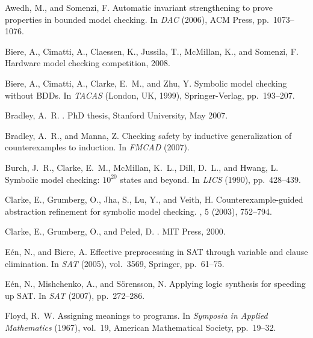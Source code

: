 \documentclass{llncs}
\begin{document}

\begin{thebibliography}{10}

{\sc Awedh, M., and Somenzi, F.}
\newblock Automatic invariant strengthening to prove properties in bounded
  model checking.
\newblock In {\em DAC\/} (2006), ACM Press, pp.~1073--1076.

{\sc Biere, A., Cimatti, A., Claessen, K., Jussila, T., McMillan, K., and
  Somenzi, F.}
\newblock Hardware model checking competition, 2008.

{\sc Biere, A., Cimatti, A., Clarke, E.~M., and Zhu, Y.}
\newblock Symbolic model checking without {BDD}s.
\newblock In {\em TACAS\/} (London, UK, 1999), Springer-Verlag, pp.~193--207.

{\sc Bradley, A.~R.}
.
\newblock PhD thesis, Stanford University, May 2007.

{\sc Bradley, A.~R., and Manna, Z.}
\newblock Checking safety by inductive generalization of counterexamples to
  induction.
\newblock In {\em FMCAD\/} (2007).

{\sc Burch, J.~R., Clarke, E.~M., McMillan, K.~L., Dill, D.~L., and Hwang, L.}
\newblock Symbolic model checking: $10^{20}$ states and beyond.
\newblock In {\em LICS\/} (1990), pp.~428--439.

{\sc Clarke, E., Grumberg, O., Jha, S., Lu, Y., and Veith, H.}
\newblock Counterexample-guided abstraction refinement for symbolic model
  checking.
, 5 (2003), 752--794.

{\sc Clarke, E., Grumberg, O., and Peled, D.}
.
\newblock MIT Press, 2000.

{\sc E{\'e}n, N., and Biere, A.}
\newblock Effective preprocessing in {SAT} through variable and clause
  elimination.
\newblock In {\em SAT\/} (2005), vol.~3569, Springer, pp.~61--75.

{\sc E{\'e}n, N., Mishchenko, A., and S{\"o}rensson, N.}
\newblock Applying logic synthesis for speeding up {SAT}.
\newblock In {\em SAT\/} (2007), pp.~272--286.

{\sc Floyd, R.~W.}
\newblock Assigning meanings to programs.
\newblock In {\em Symposia in Applied Mathematics\/} (1967), vol.~19, American
  Mathematical Society, pp.~19--32.


\end{thebibliography}
\end{document}
